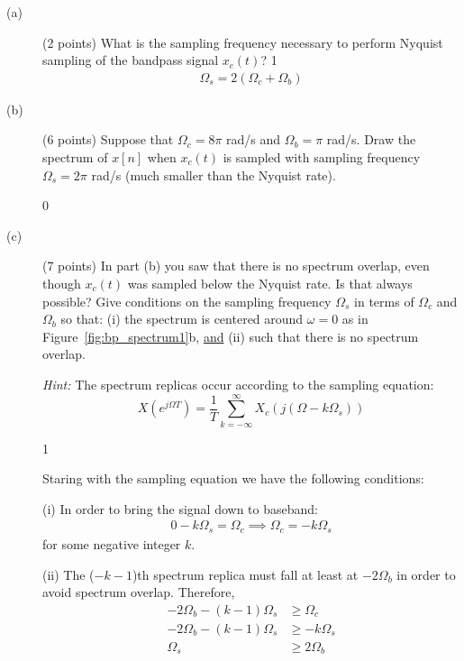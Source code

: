 \documentclass[10pt]{article}
\def\SOLUTIONS{0} %
\def\SolutionsColor{red2}
\begin{document}
\begin{description}
\item[(a)] (2 points) What is the sampling frequency necessary to perform Nyquist sampling of the bandpass signal $x_c(t)$?
\if\SOLUTIONS1
{\color{\SolutionsColor}
\begin{align*}
\Omega_{s} = 2(\Omega_c + \Omega_b)
\end{align*}
}
\else\vspace{1cm}
\fi

\item[(b)] (6 points) Suppose that $\Omega_c = 8\pi$ rad/s and $\Omega_b = \pi$ rad/s. Draw the spectrum of $x[n]$ when $x_c(t)$ is sampled with sampling frequency $\Omega_s = 2\pi$ rad/s  (much smaller than the Nyquist rate). 

\begin{figure}[!h]
\centering
	\resizebox{\textwidth}{!}{}\label{fig:bp_spectrum_sol1}
\end{figure}
\if\SOLUTIONS0\vspace{5cm}
\fi

\item[(c)] (7 points) In part (b) you saw that there is no spectrum overlap, even though $x_c(t)$ was sampled below the Nyquist rate. Is that always possible? Give conditions on the sampling frequency $\Omega_s$ in terms of $\Omega_c$ and $\Omega_b$ so that: (i) the spectrum is centered around $\omega = 0$ as in Figure~\ref{fig:bp_spectrum1}b, \underline{and} (ii) such that there is no spectrum overlap. 

\textit{Hint:} The spectrum replicas occur according to the sampling equation:
\begin{equation}
X(e^{j\Omega T}) = \frac{1}{T}\sum_{k=-\infty}^\infty X_c(j(\Omega-k\Omega_s))
\end{equation}

\if\SOLUTIONS1
{\color{\SolutionsColor}
Staring with the sampling equation we have the following conditions:

(i) In order to bring the signal down to baseband:
\begin{align*}
0 - k\Omega_s = \Omega_c \implies \Omega_c = -k\Omega_s
\end{align*}
for some negative integer $k$.

(ii) The ($-k-1$)th spectrum replica must fall at least at $-2\Omega_b$ in order to avoid spectrum overlap. Therefore, 
\begin{align*} \nonumber
-2\Omega_b - (k-1)\Omega_s &\geq \Omega_c \\ \nonumber
-2\Omega_b - (k-1)\Omega_s &\geq -k\Omega_s \tag{since $\Omega_c = -k\Omega_s$} \\
\Omega_s &\geq 2\Omega_b
\end{align*}
}
\else\vspace{10cm}
\fi



\end{description}
\end{document}
